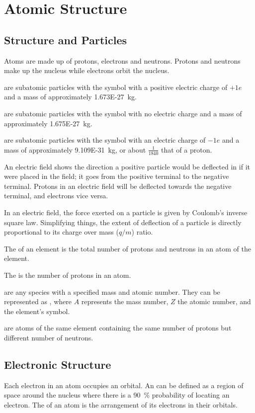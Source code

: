 \documentclass[Chemistry.tex]{subfiles}
\begin{document}
\chapter{Atomic Structure}
\section{Structure and Particles}
Atoms are made up of protons, electrons and neutrons. Protons and neutrons make up the nucleus while electrons orbit the nucleus.

 are subatomic particles with the symbol  with a positive electric charge of \(+1e\) and a mass of approximately \SI{1.673E-27}{\kilogram}.

 are subatomic particles with the symbol  with no electric charge and a mass of approximately \SI{1.675E-27}{\kilogram}.

 are subatomic particles with the symbol  with an electric charge of \(-1e\) and a mass of approximately \SI{9.109E-31}{\kilogram}, or about \(\frac{1}{1840}\) that of a proton.

An electric field shows the direction a positive particle would be deflected in if it were placed in the field; it goes from the positive terminal to the negative terminal. Protons in an electric field will be deflected towards the negative terminal, and electrons vice versa.

In an electric field, the force exerted on a particle is given by Coulomb's inverse square law. Simplifying things, the extent of deflection of a particle is directly proportional to its charge over mass (\(q/m\)) ratio.

The  of an element is the total number of protons and neutrons in an atom of the element.

The  is the number of protons in an atom.

 are any species with a specified mass and atomic number. They can be represented as , where \(A\) represents the mass number, \(Z\) the atomic number, and  the element's symbol.

 are atoms of the same element containing the same number of protons but different number of neutrons.
\section{Electronic Structure}
Each electron in an atom occupies an orbital. An  can be defined as a region of space around the nucleus where there is a \SI{90}{\percent} probability of locating an electron. The  of an atom is the arrangement of its electrons in their orbitals.
\end{document}
